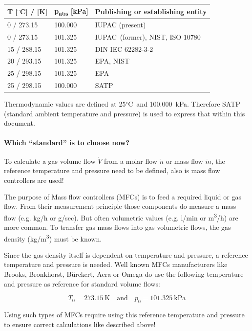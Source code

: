 \documentclass[11pt,a4paper,english,twoside]{scrreprt}
\newcommand{\gradC}{${}^\circ$C}      %
\begin{document}
\begin{tabular}{|p{2.5cm}|p{2cm}|p{7cm}|} \hline
\textbf{T [\gradC] / [K]} & \textbf{p\textsubscript{abs} [kPa]} & \textbf{Publishing or establishing entity} \\
\hline
0 / 273.15 & 100.000 & IUPAC (present) \\ \hline
0 / 273.15 & 101.325 & IUPAC~(former), NIST, ISO 10780 \\ \hline
15 / 288.15 & 101.325 & DIN IEC 62282-3-2 \cite{DIN_62282-3-2} \\ \hline
20 / 293.15 & 101.325 & EPA, NIST \\ \hline
25 / 298.15 & 101.325 & EPA \\ \hline
25 / 298.15 & 100.000 & SATP \\ \hline
\end{tabular}

Thermodynamic values are defined at 25\gradC\ and 100.000~kPa. Therefore SATP (standard ambient temperature and pressure) is used to express that within this document.

\paragraph{Which ``standard'' is to choose now?}

To calculate a gas volume flow $\dot{V}$ from a molar flow $\dot{n}$ or mass flow $\dot{m}$, the reference temperature and pressure need to be defined, also is mass flow controllers are used!

The purpose of Mass flow controllers (MFCs) is to feed a required liquid or gas flow. From their measurement principle those components do measure a mass flow (e.g. kg/h or g/sec). But often volumetric values (e.g. l/min or m\textsuperscript{3}/h) are more common. To transfer gas mass flows into gas volumetric flows, the gas density (kg/m\textsuperscript{3}) must be known.

Since the gas density itself is dependent on temperature and pressure, a reference temperature and pressure is needed. Well known MFCs manufacturers like Brooks, Bronkhorst, B\"{u}rckert, Aera or Omega do use the following temperature and pressure as reference for standard volume flows:

\[
	T_0 = \SI{273.15}{\kelvin} \quad \mbox{and} \quad p_0 = \SI{101.325}{\kPa}
\]

Using such types of MFCs require using this reference temperature and pressure to ensure correct calculations like described above!
\end{document}

